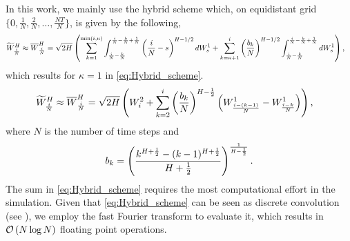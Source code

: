 In this work, we mainly use the hybrid scheme which,  on equidistant grid $\{0,\frac{1}{N},\frac{2}{N},\dots,\frac{NT}{N}\}$, is given by 
the following,
\begin{align}\label{eq:Hybrid_scheme_pre}
\widetilde{W}^H_{\frac{i}{N}} \approx \overline{W}^H_{\frac{i}{N}}&= \sqrt{2H} \left(  \sum_{k=1}^{\min(i,\kappa)} \int_{\frac{i}{N}-\frac{k}{N}}^{\frac{i}{N}-\frac{k}{N}+\frac{1}{N}} \left(\frac{i}{N}-s\right)^{H - 1/2} dW^1_s+\sum_{k=\kappa+1}^{i} \left(\frac{b_k}{N}\right)^{H - 1/2}  \int_{\frac{i}{N}-\frac{k}{N}}^{\frac{i}{N}-\frac{k}{N}+\frac{1}{N}} dW^1_s \right) ,
\end{align}
which results for $\kappa=1$  in \eqref{eq:Hybrid_scheme}.
\begin{align}\label{eq:Hybrid_scheme}
\widetilde{W}^H_{\frac{i}{N}} \approx \overline{W}^H_{\frac{i}{N}}&= \sqrt{2H} \left(  W^2_i+\sum_{k=2}^{i} \left(\frac{b_k}{N}\right)^{H-\frac{1}{2}} \left(W_{\frac{i-(k-1)}{N}}^1-W_{\frac{i-k}{N}}^1\right)\right),
\end{align}
where $N$ is the number of time steps and 
$$ b_k=\left(\frac{k^{H+\frac{1}{2}}-(k-1)^{H+\frac{1}{2} }}{H+\frac{1}{2}}\right)^{\frac{1}{H-\frac{1}{2}}} .$$
The sum in \eqref{eq:Hybrid_scheme} requires the most computational effort in the simulation. Given that \eqref{eq:Hybrid_scheme} can be seen as discrete convolution  (see \cite{bennedsen2017hybrid}), we employ the fast Fourier transform to evaluate it, which results in  ${\mathcal{O}}\left(N \log N\right)$ floating point operations.

